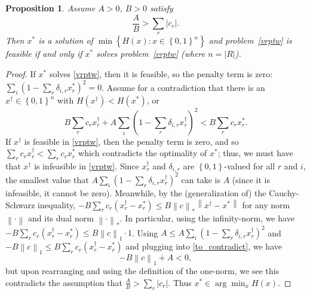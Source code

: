 \documentclass[11pt]{article}
\newtheorem{proposition}{Proposition}
\theoremstyle{definition}
\newcommand{\abs}[1]{\left| #1 \right|}
\newcommand{\norm}[1]{\left\| #1 \right\|}
\newcommand{\set}[1]{\left\{ #1 \right\}}
\newcommand{\card}[1]{\left| #1 \right|}
\newcommand{\smallsum}{{\textstyle{\sum}}}
\newcommand{\0}{\mathbf{0}}
\begin{document}
\begin{proposition}
\label{prop:penalty}
Assume $A > 0$, $B > 0$ satisfy
\[
	\frac{A}{B} > \sum_r \abs{c_r}.
\]
Then 
$x^*$ is a solution of $\min\set{ H(x) : x \in \set{0,1}^n }$
and problem~\eqref{vrptw} is feasible
if and only if
$x^*$ solves problem~\eqref{vrptw}
(where $n = \card{R}$).
\end{proposition}
%
\begin{proof}
If $x^*$ solves \eqref{vrptw}, then it is feasible, so the penalty term is zero:
$\sum_i (1 - \smallsum_r \delta_{i,r} x_r^*)^2 = 0$.
Assume for a contradiction that there is an $x^{\dagger} \in \set{0,1}^n$ with $H(x^{\dagger}) < H(x^*)$, or
\begin{equation}
\label{to_contradict}
B \sum_r c_r x_r^{\dagger} + A \sum_i (1 - \smallsum_r \delta_{i,r} x_r^{\dagger})^2 
<
B \sum_r c_r x_r^*.
\end{equation}
If $x^{\dagger}$ is feasible in \eqref{vrptw}, then the penalty term is zero, and so 
$\sum_r c_r x_r^{\dagger} < \sum_r c_r x_r^{*}$ which contradicts the optimality of $x^*$;
thus, we must have that $x^{\dagger}$ is infeasible in \eqref{vrptw}.
Since $x^{\dagger}_r$ and  $\delta_{i,r}$ are $\set{0,1}$-valued for all $r$ and $i$, the smallest value that 
$A \sum_i (1 - \smallsum_r \delta_{i,r} x_r^{\dagger})^2$ 
can take is $A$
(since it is infeasible, it cannot be zero).
Meanwhile, by the (generalization of) the Cauchy-Schwarz inequality,
$-B \sum_r c_r (x_r^{\dagger} - x_r^*) \le B \norm{c}_* \norm{x^{\dagger} - x^*}$
for any norm $\norm{\cdot}$ and its dual norm $\norm{\cdot}_*$.
In particular, using the infinity-norm, we have
$-B \sum_r c_r (x_r^{\dagger} - x_r^*) \le B \norm{c}_1 \cdot 1$.
Using 
$A \le A \sum_i (1 - \smallsum_r \delta_{i,r} x_r^{\dagger})^2$
and
$- B \norm{c}_1 \le B \sum_r c_r (x_r^{\dagger} - x_r^*)$
and plugging into \eqref{to_contradict},
we have 
\[
-B \norm{c}_1 + A < 0,
\]
but upon rearranging and using the definition of the one-norm, we see this contradicts the assumption that
$\frac{A}{B} > \sum_r \abs{c_r}$.
Thus $x^* \in \arg \min_x H(x)$.


\end{proof}
\end{document}
